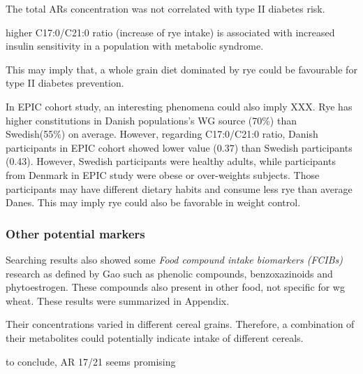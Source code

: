 The total ARs concentration was not correlated with type II diabetes risk.

higher C17:0/C21:0 ratio (increase of rye intake) is associated with increased insulin sensitivity in a population with metabolic syndrome.

This may imply that, a whole grain diet dominated by rye could be favourable for type II diabetes prevention. 

In EPIC cohort study, an interesting phenomena could also imply XXX. Rye has higher constitutions in Danish populations's WG source (70\%) than Swedish(55\%) on average. However, regarding C17:0/C21:0 ratio, Danish participants in EPIC cohort showed lower value (0.37) than Swedish participants (0.43). 
However, Swedish participants were healthy adults, while participants from Denmark in EPIC study were obese or over-weights subjects. Those participants may have different dietary habits and consume less rye than average Danes. This may imply rye could also be favorable in weight control. 




\subsubsection{Other potential markers}
Searching results also showed some \textit{Food compound intake biomarkers (FCIBs)} research as defined by Gao\cite{Gao2017} such as phenolic compounds\cite{ISI:000389134200003}, benzoxazinoids\cite{ISI:000394168100034} and phytoestrogen\cite{ISI:000384082300001}. These compounds also present in other food,  not specific for \acrshort{wg} wheat. These results were summarized in Appendix.

Their concentrations varied in different cereal grains. Therefore, a combination of their metabolites could potentially indicate intake of different cereals.


to conclude, AR 17/21 seems promising 